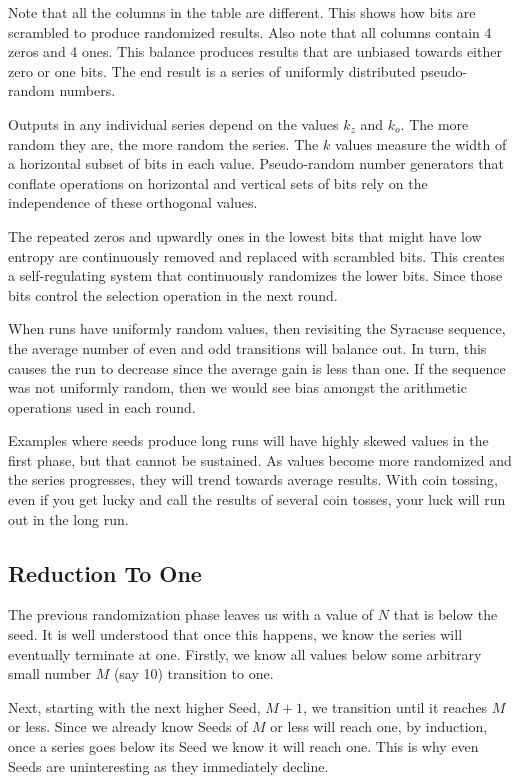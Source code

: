 \documentclass[preprint]{sigplanconf}
\begin{document}
Note that all the columns in the table are different. This shows how bits are scrambled to produce randomized results. Also note that all columns contain 4 zeros and 4 ones. This balance produces results that are unbiased towards either zero or one bits. The end result is a series of uniformly distributed pseudo-random numbers.

Outputs in any individual series depend on the values $k_z$ and $k_o$. The more random they are, the more random the series. The $k$ values measure the width of a horizontal subset of bits in each value. Pseudo-random number generators that conflate operations on horizontal and vertical sets of bits rely on the independence of these orthogonal values.

The repeated zeros and upwardly ones in the lowest bits that might have low entropy are continuously removed and replaced with scrambled bits. This creates a self-regulating system that continuously randomizes the lower bits. Since those bits control the selection operation in the next round.

When runs have uniformly random values, then revisiting the Syracuse sequence, the average number of even and odd transitions will balance out. In turn, this causes the run to decrease since the average gain is less than one. If the sequence was not uniformly random, then we would see bias amongst the arithmetic operations used in each round.

Examples where seeds produce long runs will have highly skewed values in the first phase, but that cannot be sustained. As values become more randomized and the series progresses, they will trend towards average results. With coin tossing, even if you get lucky and call the results of several coin tosses, your luck will run out in the long run.

\subsection{Reduction To One}

The previous randomization phase leaves us with a value of \( N \) that is below the seed. It is well understood that once this happens, we know the series will eventually terminate at one. Firstly, we know all values below some arbitrary small number \( M \) (say 10) transition to one.

Next, starting with the next higher Seed, \( M + 1 \), we transition until it reaches \( M \) or less. Since we already know Seeds of \( M \) or less will reach one, by induction, once a series goes below its Seed we know it will reach one. This is why even Seeds are uninteresting as they immediately decline.
\end{document}

